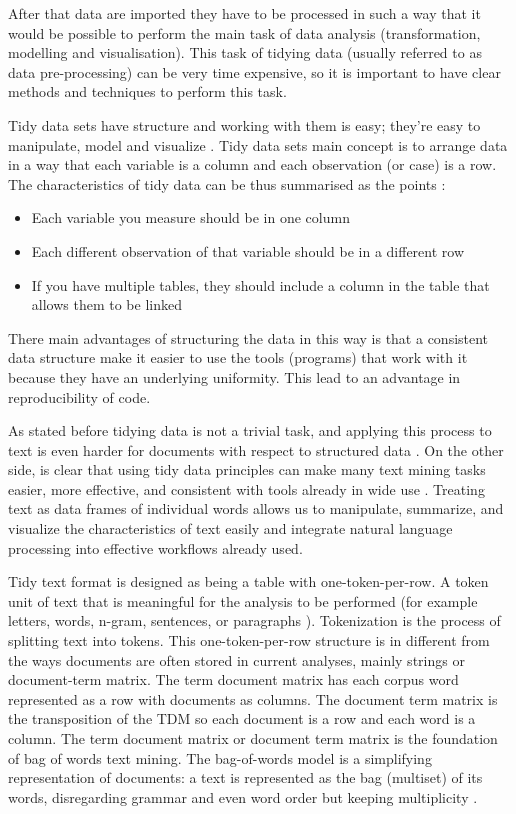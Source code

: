 \documentclass[]{book}
\providecommand{\tightlist}{%
  \setlength{\itemsep}{0pt}\setlength{\parskip}{0pt}}
\begin{document}
After that data are imported they have to be processed in such a way
that it would be possible to perform the main task of data analysis
(transformation, modelling and visualisation). This task of tidying data
(usually referred to as data pre-processing) can be very time expensive,
so it is important to have clear methods and techniques to perform this
task.

Tidy data sets have structure and working with them is easy; they're
easy to manipulate, model and visualize \citep{wickham2014tidy}. Tidy
data sets main concept is to arrange data in a way that each variable is
a column and each observation (or case) is a row. The characteristics of
tidy data can be thus summarised as the points \citep{leek2015elements}:

\begin{itemize}
\tightlist
\item
  Each variable you measure should be in one column
\item
  Each different observation of that variable should be in a different
  row
\item
  If you have multiple tables, they should include a column in the table
  that allows them to be linked
\end{itemize}

There main advantages of structuring the data in this way is that a
consistent data structure make it easier to use the tools (programs)
that work with it because they have an underlying uniformity. This lead
to an advantage in reproducibility of code.

As stated before tidying data is not a trivial task, and applying this
process to text is even harder for documents with respect to structured
data \citep{silge2016tidytext}. On the other side, is clear that using
tidy data principles can make many text mining tasks easier, more
effective, and consistent with tools already in wide use . Treating text
as data frames of individual words allows us to manipulate, summarize,
and visualize the characteristics of text easily and integrate natural
language processing into effective workflows already used.

Tidy text format is designed as being a table with one-token-per-row. A
token unit of text that is meaningful for the analysis to be performed
(for example letters, words, n-gram, sentences, or paragraphs ).
Tokenization is the process of splitting text into tokens. This
one-token-per-row structure is in different from the ways documents are
often stored in current analyses, mainly strings or document-term
matrix. The term document matrix has each corpus word represented as a
row with documents as columns. The document term matrix is the
transposition of the TDM so each document is a row and each word is a
column. The term document matrix or document term matrix is the
foundation of bag of words text mining. The bag-of-words model is a
simplifying representation of documents: a text is represented as the
bag (multiset) of its words, disregarding grammar and even word order
but keeping multiplicity \citep{mctear2016conversational}.
\end{document}
